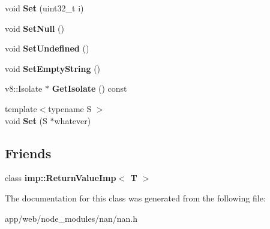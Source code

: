 \begin{DoxyCompactItemize}
void {\bfseries Set} (uint32\+\_\+t i)
\item 
\mbox{\label{class_nan_1_1_return_value_af8b43b6c338e201c947305cc7272c14b}} 
void {\bfseries Set\+Null} ()
\item 
\mbox{\label{class_nan_1_1_return_value_a1ded8f9cd15cef804eb86071f51d182d}} 
void {\bfseries Set\+Undefined} ()
\item 
\mbox{\label{class_nan_1_1_return_value_a24b35e353b5d1c85d9e9609fac99c1a9}} 
void {\bfseries Set\+Empty\+String} ()
\item 
\mbox{\label{class_nan_1_1_return_value_a05b344971a9d5a7a63f702c14c12b6d0}} 
v8\+::\+Isolate $\ast$ {\bfseries Get\+Isolate} () const
\item 
\mbox{\label{class_nan_1_1_return_value_a665a740ef68257678c0cdfaeb6c81894}} 
{\footnotesize template$<$typename S $>$ }\\void {\bfseries Set} (S $\ast$whatever)
\end{DoxyCompactItemize}
\subsection*{Friends}
\begin{DoxyCompactItemize}
\item 
\mbox{\label{class_nan_1_1_return_value_a916b17659a798dd2aa88262b08f09a67}} 
class {\bfseries imp\+::\+Return\+Value\+Imp$<$ T $>$}
\end{DoxyCompactItemize}


The documentation for this class was generated from the following file\+:\begin{DoxyCompactItemize}
\item 
app/web/node\+\_\+modules/nan/nan.\+h\end{DoxyCompactItemize}
